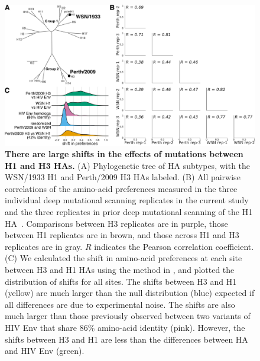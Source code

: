 \documentclass[9pt,twocolumn,twoside]{pnas-new-for-biorxiv}
\begin{document}
\begin{figure}
\centering
\includegraphics[width=12cm]{figs/distance_distribution/distance_distribution.pdf}
\caption{\label{fig:distance_distribution}
{\bf There are large shifts in the effects of mutations between H1 and H3 HAs.}
(A) Phylogenetic tree of HA subtypes, with the WSN/1933 H1 and Perth/2009 H3 HAs labeled.
(B) All pairwise correlations of the amino-acid preferences measured in the three individual deep mutational scanning replicates in the current study and the three replicates in prior deep mutational scanning of the H1 HA~\cite{doud2016accurate}.
Comparisons between H3 replicates are in purple, those between H1 replicates are in brown, and those across H1 and H3 replicates are in gray.
$R$ indicates the Pearson correlation coefficient.
(C) We calculated the shift in amino-acid preferences at each site between H3 and H1 HAs using the method in \cite{haddox2018mapping}, and plotted the distribution of shifts for all sites.
The shifts between H3 and H1 (yellow) are much larger than the null distribution (blue) expected if all differences are due to experimental noise.
The shifts are also much larger than those previously observed between two variants of HIV Env that share 86\% amino-acid identity (pink).
However, the shifts between H3 and H1 are less than the differences between HA and HIV Env (green).
}
\end{figure}
\end{document}
